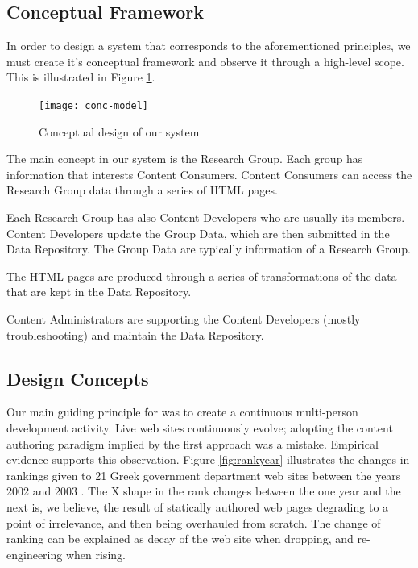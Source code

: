 \documentclass[10pt]{article}
\begin{document}
\subsection{Conceptual Framework}

In order to design a system that corresponds to the aforementioned principles, 
we must create it's conceptual framework and observe it through a high-level
scope. This is illustrated in Figure \ref{fig:conc-model}.

\begin{figure}[h!]
\begin{center}
\texttt{[image: conc-model]}
\end{center}
\caption{Conceptual design of our system}
\label{fig:conc-model}
\end{figure}

The main concept in our system is the Research Group. Each group has 
information that interests Content Consumers. Content Consumers 
can access the Research Group data through a series of HTML pages.

Each Research Group has also Content Developers who are usually its members.
Content Developers update the Group Data, which are then submitted in the 
Data Repository. The Group Data are typically information of a Research Group.

The HTML pages are produced through a series of transformations of the data that
are kept in the Data Repository.

Content Administrators are supporting the Content Developers (mostly troubleshooting) 
and maintain the Data Repository.

\subsection{Design Concepts}

Our main guiding principle for was to create a continuous multi-person 
development activity.
Live web sites continuously evolve;
adopting the content authoring paradigm implied
by the first approach was a mistake.
Empirical evidence supports this observation.
Figure \ref{fig:rankyear} illustrates the changes
in rankings given to 21 Greek government department
web sites between the years 2002 and 2003 \cite{G03}.
The X shape in the rank changes between the one year and the next
is, we believe, the result of statically authored web pages
degrading to a point of irrelevance, and then being overhauled
from scratch. The change of ranking can be explained as decay of the web site when dropping,
and re-engineering when rising.
\end{document}
